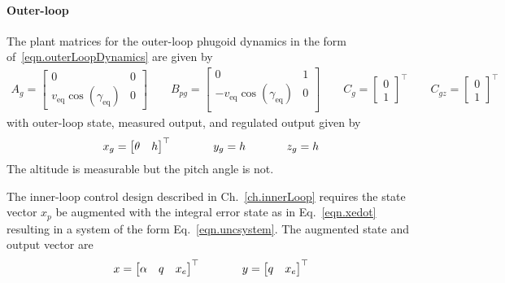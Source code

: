 \paragraph{Outer-loop}
The plant matrices for the outer-loop phugoid dynamics in the form of\ \eqref{eqn.outerLoopDynamics} are given by
\begin{equation*}
  \begin{gathered}
    A_{g} =
    \begin{bmatrix}
      0 & 0 \\
      v_{\text{eq}}\cos(\gamma_{\text{eq}}) & 0
    \end{bmatrix}
    \qquad
    B_{pg} =
    \begin{bmatrix}
      0 & 1 \\
      -v_{\text{eq}}\cos(\gamma_{\text{eq}}) & 0 \\
    \end{bmatrix}
    \qquad
    C_{g} =
    \begin{bmatrix}
      0 \\
      1
    \end{bmatrix}^{\top}
    \qquad
    C_{gz} =
    \begin{bmatrix}
      0 \\
      1
    \end{bmatrix}^{\top}
  \end{gathered}
\end{equation*}
with outer-loop state, measured output, and regulated output given by
\begin{equation*}
  x_{g} =
  \begin{bmatrix}
    \theta & h
  \end{bmatrix}^{\top}
  \hspace{0.5in}
  y_{g} = h
  \hspace{0.5in}
  z_{g} =h
\end{equation*}
The altitude is measurable but the pitch angle is not.

The inner-loop control design described in Ch.~\ref{ch.innerLoop} requires the state vector $x_{p}$ be augmented with the integral error state as in Eq.\ \eqref{eqn.xedot} resulting in a system of the form Eq.\ \eqref{eqn.uncsystem}.
The augmented state and output vector are
\begin{equation*}
  x=
  \begin{bmatrix}
    \alpha & q & x_{e}
  \end{bmatrix}^{\top}
  \hspace{0.5in}
  y=
  \begin{bmatrix}
    q & x_{e}
  \end{bmatrix}^{\top}
\end{equation*}

